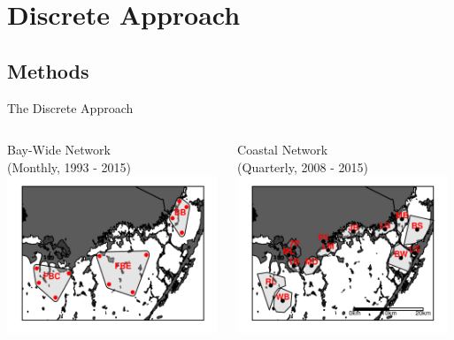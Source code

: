 \documentclass[compress,noflama,nosectionpages]{beamer}
\begin{document}
\section{Discrete Approach}
\subsection{Methods}
\begin{frame}{The Discrete Approach}
	\begin{columns}
		\begin{column}[c]{5.5cm}
			\begin{center}
			Bay-Wide Network\\ (Monthly, 1993 - 2015)
			\includegraphics[height=4.7cm,clip=true,trim = 0mm 0mm 0mm 0mm,keepaspectratio=true]{figures/fbmap_wqmn.png}%
			\end{center}
		\end{column}
	
		\begin{column}[c]{6cm}
			\begin{center}
			Coastal Network\\ (Quarterly, 2008 - 2015)
			\includegraphics[height=4.7cm,clip=true,trim = 0mm 0mm 0mm 0mm,keepaspectratio=true]{figures/fbmap_dflow.png}%
			\end{center}
		\end{column}
	\end{columns}
\end{frame}
\end{document}
